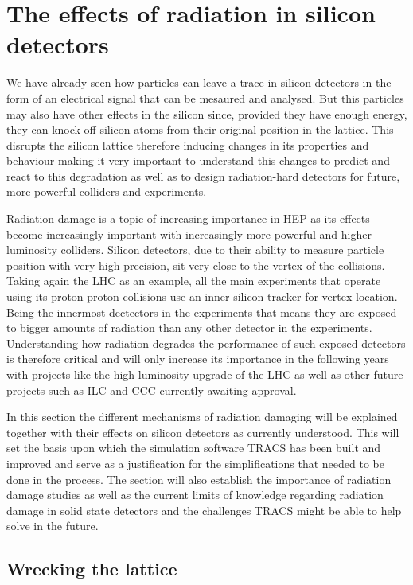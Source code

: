 \chapter{The effects of radiation in silicon detectors}

We have already seen how particles can leave a trace in silicon detectors in the form of an electrical signal that can be mesaured and analysed. But this particles may also have other effects in the silicon since, provided they have enough energy, they can knock off silicon atoms from their original position in the lattice. This disrupts the silicon lattice therefore inducing changes in its properties and behaviour making it very important to understand this changes to predict and react to this degradation as well as to design radiation-hard detectors for future, more powerful colliders and experiments. 

Radiation damage is a topic of increasing importance in HEP as its effects become increasingly important with increasingly more powerful and higher luminosity colliders. Silicon detectors, due to their ability to measure particle position with very high precision, sit very close to the vertex of the collisions. Taking again the LHC as an example, all the main experiments that operate using its proton-proton collisions use an inner silicon tracker for vertex location. Being the innermost dectectors in the experiments that means they are exposed to bigger amounts of radiation than any other detector in the experiments. Understanding how radiation degrades the performance of such exposed detectors is therefore critical and will only increase its importance in the following years with projects like the high luminosity upgrade of the LHC as well as other future projects such as ILC and CCC currently awaiting approval.

In this section the different mechanisms of radiation damaging will be explained together with their effects on silicon detectors as currently understood. This will set the basis upon which the simulation software TRACS has been built and improved and serve as a justification for the simplifications that needed to be done in the process. The section will also establish the importance of radiation damage studies as well as the current limits of knowledge regarding radiation damage in solid state detectors and the challenges TRACS might be able to help solve in the future.


\section{Wrecking the lattice}

